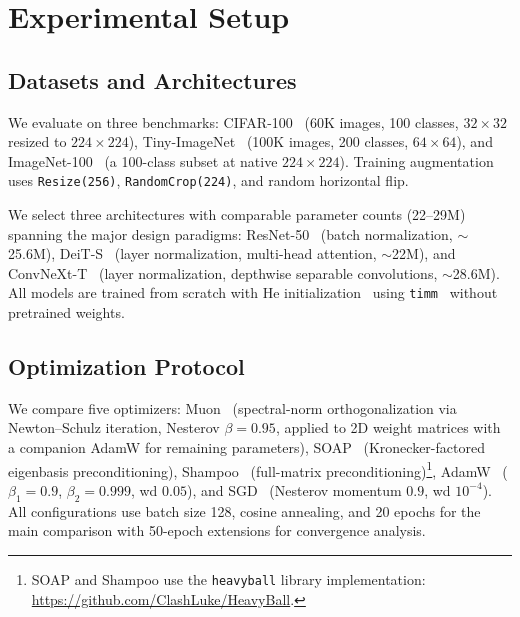 \section{Experimental Setup}
\label{sec:experimental_setup}

\subsection{Datasets and Architectures}
\label{sec:datasets_archs}

We evaluate on three benchmarks: CIFAR-100~\cite{krizhevsky2009learning} (60K images, 100 classes, $32{\times}32$ resized to $224{\times}224$), Tiny-ImageNet~\cite{le2015tiny} (100K images, 200 classes, $64{\times}64$), and ImageNet-100~\cite{deng2009imagenet} (a 100-class subset at native $224{\times}224$). Training augmentation uses \texttt{Resize(256)}, \texttt{RandomCrop(224)}, and random horizontal flip.

We select three architectures with comparable parameter counts (22--29M) spanning the major design paradigms: ResNet-50~\cite{he2016deep} (batch normalization, $\sim$25.6M), DeiT-S~\cite{touvron2021training} (layer normalization, multi-head attention, $\sim$22M), and ConvNeXt-T~\cite{liu2022convnet} (layer normalization, depthwise separable convolutions, $\sim$28.6M). All models are trained from scratch with He initialization~\cite{he2015delving} using \texttt{timm}~\cite{rw2019timm} without pretrained weights.

\subsection{Optimization Protocol}
\label{sec:optim_protocol}

We compare five optimizers: Muon~\cite{jordan2024muon} (spectral-norm orthogonalization via Newton--Schulz iteration, Nesterov $\beta{=}0.95$, applied to 2D weight matrices with a companion AdamW for remaining parameters), SOAP~\cite{vyas2024soap} (Kronecker-factored eigenbasis preconditioning), Shampoo~\cite{gupta2018shampoo} (full-matrix preconditioning)\footnote{SOAP and Shampoo use the \texttt{heavyball} library implementation: \url{https://github.com/ClashLuke/HeavyBall}.}, AdamW~\cite{loshchilov2019decoupled,kingma2015adam} ($\beta_1{=}0.9$, $\beta_2{=}0.999$, wd $0.05$), and SGD~\cite{sutskever2013importance} (Nesterov momentum $0.9$, wd $10^{-4}$). All configurations use batch size 128, cosine annealing, and 20 epochs for the main comparison with 50-epoch extensions for convergence analysis.

